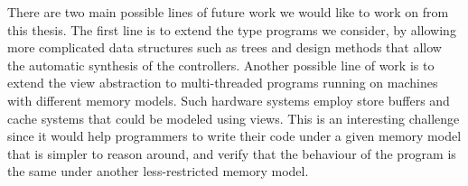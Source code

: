 There are two main possible lines of future work we would like to work on from this thesis. The first line is to
extend the type programs we consider, by allowing more complicated data structures such as trees and design methods that allow the automatic synthesis of the controllers. Another possible line of work is to extend the view abstraction to
multi-threaded programs running on machines with different memory
models. Such hardware systems employ store buffers and cache systems
that could be modeled using views. This is an interesting challenge since it would help programmers to
write their code under a given memory model that is simpler to reason
around, and verify that the behaviour of the program is the same under
another less-restricted memory model.



